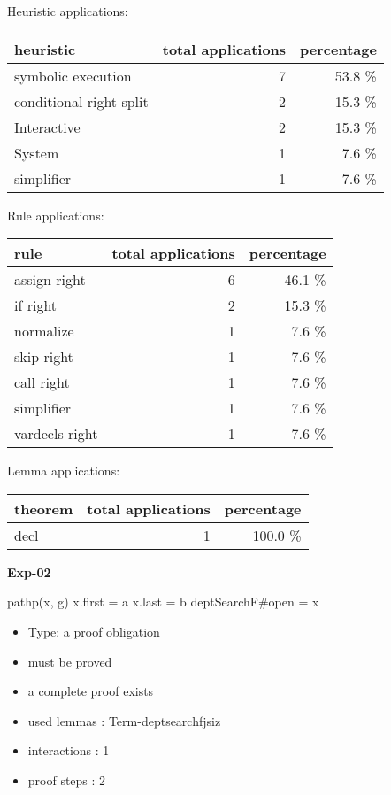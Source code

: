 \documentclass[a4paper]{article}
\begin{document}
Heuristic applications:

\begin{supertabular}{l|r|r}
heuristic	& total applications & percentage \\ \hline
symbolic execution & 7 & 53.8 \% \\
conditional right split & 2 & 15.3 \% \\
Interactive & 2 & 15.3 \% \\
System & 1 & 7.6 \% \\
simplifier & 1 & 7.6 \% \\

\end{supertabular}

Rule applications:

\begin{supertabular}{l|r|r}
rule	        & total applications & percentage \\ \hline
assign right & 6 & 46.1 \% \\
if right & 2 & 15.3 \% \\
normalize & 1 & 7.6 \% \\
skip right & 1 & 7.6 \% \\
call right & 1 & 7.6 \% \\
simplifier & 1 & 7.6 \% \\
vardecls right & 1 & 7.6 \% \\

\end{supertabular}

Lemma applications:

\begin{supertabular}{l|r|r}
theorem	        & total applications & percentage \\ \hline
decl & 1 & 100.0 \% \\

\end{supertabular}
\pagebreak

{\LARGE\bf Exp-02}\label{lemma-Exp-02}

\medskip

 \Fol pathp(x, g) \And x.first = a \And x.last = b \Imp \Do deptSearchF\#\Dc open = x

\begin{itemize}

\item Type: a proof obligation

\item       must be proved
\item       a complete proof exists
\item       used lemmas  : Term-deptsearchfjsiz
\item       interactions : 1
\item       proof steps  : 2
\end{itemize}
\end{document}
